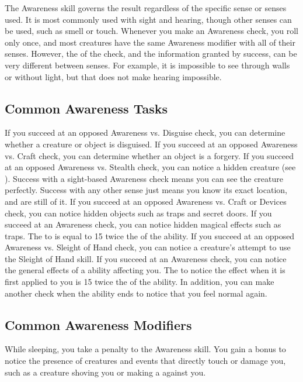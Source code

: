     The Awareness skill governs the result regardless of the specific sense or senses used.
    It is most commonly used with sight and hearing, though other senses can be used, such as smell or touch.
    Whenever you make an Awareness check, you roll only once, and most creatures have the same Awareness modifier with all of their senses.
    However, the  of the check, and the information granted by success, can be very different between senses.
    For example, it is impossible to see through walls or without light, but that does not make hearing impossible.

    \subsection{Common Awareness Tasks}

         If you succeed at an opposed Awareness vs. Disguise check, you can determine whether a creature or object is disguised.
         If you succeed at an opposed Awareness vs. Craft check, you can determine whether an object is a forgery.
         If you succeed at an opposed Awareness vs. Stealth check, you can notice a hidden creature (see ).
        Success with a sight-based Awareness check means you can see the creature perfectly.
        Success with any other sense just means you know its exact location, and are still \partiallyunaware of it.
         If you succeed at an opposed Awareness vs. Craft or Devices check, you can notice hidden objects such as traps and secret doors.
         If you succeed at an Awareness check, you can notice hidden magical effects such as traps.
        The  to is equal to 15 \add twice the  of the ability.
         If you succeed at an opposed Awareness vs. Sleight of Hand check, you can notice a creature's attempt to use the Sleight of Hand skill.
         If you succeed at an Awareness check, you can notice the general effects of a  ability affecting you.
        The  to notice the effect when it is first applied to you is 15 \add twice the  of the ability.
        In addition, you can make another check when the ability ends to notice that you feel normal again.

    \subsection{Common Awareness Modifiers}\label{Common Awareness Modifiers}
        While sleeping, you take a  penalty to the Awareness skill.
        You gain a  bonus to notice the presence of creatures and events that directly touch or damage you, such as a creature shoving you or making a  against you.

